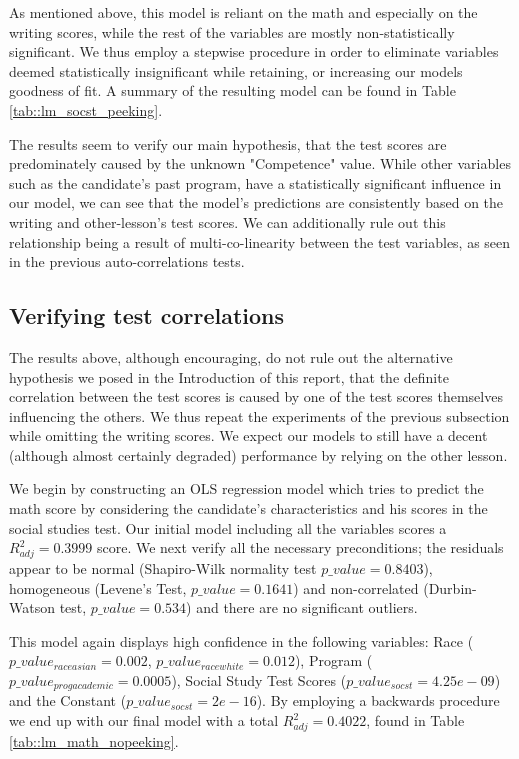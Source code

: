 \documentclass[10pt]{article}
\begin{document}
	As mentioned above, this model is reliant on the math and especially on the writing scores, while the rest of the variables are mostly non-statistically significant. We thus employ a stepwise procedure in order to eliminate variables deemed statistically insignificant while retaining, or increasing our models goodness of fit. A summary of the resulting model can be found in Table \ref{tab::lm_socst_peeking}.
	
	The results seem to verify our main hypothesis, that the test scores are predominately caused by the unknown "Competence" value. While other variables such as the candidate's past program, have a statistically significant influence in our model, we can see that the model's predictions are consistently based on the writing and other-lesson's test scores. We can additionally rule out this relationship being a result of multi-co-linearity between the test variables, as seen in the previous auto-correlations tests.
	
	
	
	
	
	\subsection{Verifying test correlations}
	
	The results above, although encouraging, do not rule out the alternative hypothesis we posed in the Introduction of this report, that the definite correlation between the test scores is caused by one of the test scores themselves influencing the others. We thus repeat the experiments of the previous subsection while omitting the writing scores. We expect our models to still have a decent (although almost certainly degraded) performance by relying on the other lesson.
	
	We begin by constructing an OLS regression model which tries to predict the math score by considering the candidate's characteristics and his scores in the social studies test. Our initial model including all the variables scores a $R^2_{adj} = 0.3999$ score. We next verify all the necessary preconditions; the residuals appear to be normal (Shapiro-Wilk normality test $p\_value = 0.8403$), homogeneous (Levene's Test, $p\_value = 0.1641$) and non-correlated (Durbin-Watson test, $p\_value=0.534$) and there are no significant outliers. 
	
	This model again displays high confidence in the following variables: Race ($p\_value_{raceasian} = 0.002$, $p\_value_{racewhite} = 0.012$), Program ($p\_value_{progacademic} = 0.0005$), Social Study Test Scores ($p\_value_{socst} = 4.25e-09$) and the Constant ($p\_value_{socst} = 2e-16$). By employing a backwards procedure we end up with our final model with a total $R^2_{adj} = 0.4022$, found in Table \ref{tab::lm_math_nopeeking}.
	
\end{document}
